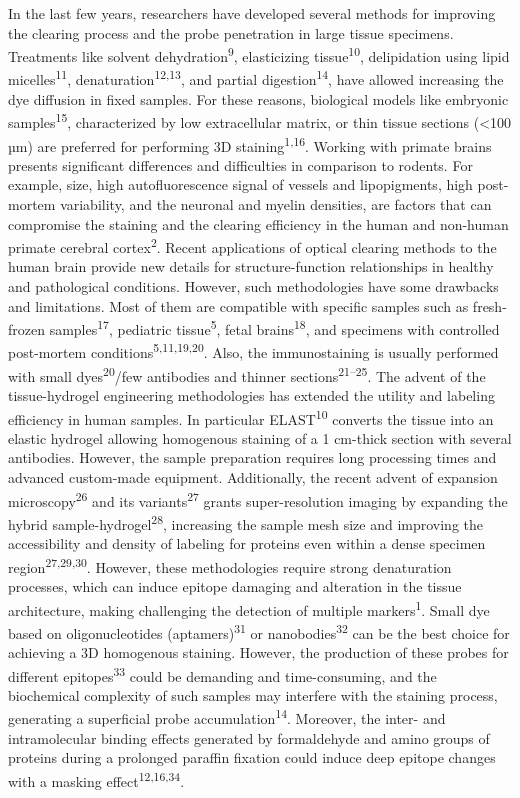 \documentclass{article}
\begin{document}
In the last few years, researchers have developed several methods for improving the clearing process and the probe penetration in large tissue specimens. Treatments like solvent dehydration\textsuperscript{9}, elasticizing tissue\textsuperscript{10}, delipidation using lipid micelles\textsuperscript{11}, denaturation\textsuperscript{12,13}, and partial digestion\textsuperscript{14}, have allowed increasing the dye diffusion in fixed samples. For these reasons, biological models like embryonic samples\textsuperscript{15}, characterized by low extracellular matrix, or thin tissue sections (<100 µm) are preferred for performing 3D staining\textsuperscript{1,16}. Working with primate brains presents significant differences and difficulties in comparison to rodents. For example, size, high autofluorescence signal of vessels and lipopigments, high post-mortem variability, and the neuronal and myelin densities, are factors that can compromise the staining and the clearing efficiency in the human and non-human primate cerebral cortex\textsuperscript{2}. Recent applications of optical clearing methods to the human brain provide new details for structure-function relationships in healthy and pathological conditions. However, such methodologies have some drawbacks and limitations. Most of them are compatible with specific samples such as fresh-frozen samples\textsuperscript{17}, pediatric tissue\textsuperscript{5}, fetal brains\textsuperscript{18}, and specimens with controlled post-mortem conditions\textsuperscript{5,11,19,20}. Also, the immunostaining is usually performed with small dyes\textsuperscript{20}/few antibodies and thinner sections\textsuperscript{21–25}. The advent of the tissue-hydrogel engineering methodologies has extended the utility and labeling efficiency in human samples. In particular ELAST\textsuperscript{10} converts the tissue into an elastic hydrogel allowing homogenous staining of a 1 cm-thick section with several antibodies. However, the sample preparation requires long processing times and advanced custom-made equipment. Additionally, the recent advent of expansion microscopy\textsuperscript{26} and its variants\textsuperscript{27} grants super-resolution imaging by expanding the hybrid sample-hydrogel\textsuperscript{28}, increasing the sample mesh size and improving the accessibility and density of labeling for proteins even within a dense specimen region\textsuperscript{27,29,30}. However, these methodologies require strong denaturation processes, which can induce epitope damaging and alteration in the tissue architecture, making challenging the detection of multiple markers\textsuperscript{1}. Small dye based on oligonucleotides (aptamers)\textsuperscript{31} or nanobodies\textsuperscript{32} can be the best choice for achieving a 3D homogenous staining. However, the production of these probes for different epitopes\textsuperscript{33} could be demanding and time-consuming, and the biochemical complexity of such samples may interfere with the staining process, generating a superficial probe accumulation\textsuperscript{14}. Moreover, the inter- and intramolecular binding effects generated by formaldehyde and amino groups of proteins during a prolonged paraffin fixation could induce deep epitope changes with a masking effect\textsuperscript{12,16,34}. 
\end{document}
